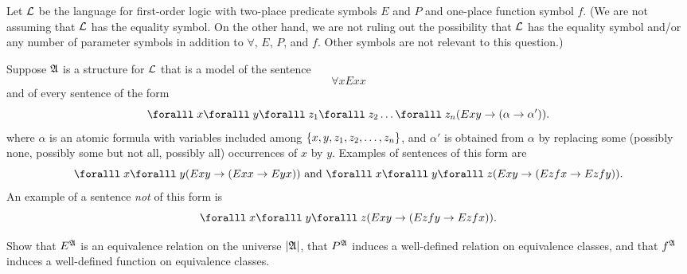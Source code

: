 \begin{problem}
  Let $\mathcal{L}$ be the language for first-order logic with two-place
  predicate symbols $E$ and $P$ and one-place function symbol $f$.
  (We are not assuming that $\mathcal{L}$ has the equality symbol.
  On the other hand, we are not ruling out the possibility that
  $\mathcal{L}$ has the equality symbol and/or any number of parameter symbols
  in addition to $\forall$, $E$, $P$, and $f$.
  Other symbols are not relevant to this question.)

  \step
  Suppose $\mathfrak{A}$ is a structure for $\mathcal{L}$ that is a model of the sentence
  \[ \forall xExx \]
  and of every sentence of the form
  \[
    \forall x \forall y \forall z_1 \forall z_2 \ldots \forall z_n
    (Exy \lto (\alpha \lto \alpha')).
  \]
  where $\alpha$ is an atomic formula with variables included among
  $\left\{x,y,z_1,z_2,\ldots,z_n\right\}$, and $\alpha'$ is
  obtained from $\alpha$ by replacing some
  (possibly none, possibly some but not all, possibly all)
  occurrences of $x$ by $y$.
  Examples of sentences of this form are
  \[ \forall x \forall y (Exy \lto (Exx \lto Eyx))
  \text{ and }
  \forall x \forall y \forall z (Exy \lto (Ez fx \lto Ez fy)).
  \]
  An example of a sentence \emph{not} of this form is
  \[
    \forall x \forall y \forall z (Exy \lto (Ez fy \lto Ez fx)).
  \]

  \step
  Show that $E^{\mathfrak{A}}$ is an equivalence relation on the universe $\lvert\mathfrak{A}\rvert$,
  that $P^{\mathfrak{A}}$ induces a well-defined relation on equivalence classes, and that $f^{\mathfrak{A}}$
  induces a well-defined function on equivalence classes.
\end{problem}

